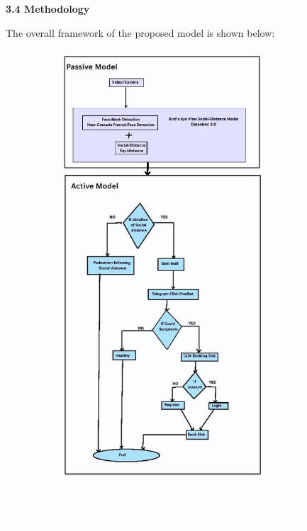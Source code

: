 \documentclass[12pt]{article}
\begin{document}
\vspace{\baselineskip}

\vspace{\baselineskip}

\vspace{\baselineskip}
\vspace{\baselineskip}
\vspace{\baselineskip}
\vspace{\baselineskip}
\vspace{\baselineskip}
\vspace{\baselineskip}

\begin{FlushLeft}
{\fontsize{14pt}{16.8pt}\selectfont \textbf{3.4 Methodology}}
\end{FlushLeft}
\begin{FlushLeft}
The overall framework of the proposed model is shown below:
\end{FlushLeft}



\begin{figure}[H]
	\begin{Center}
		\includegraphics[width=4.32in,height=7in]{./media/image4.png}
	\end{Center}
\end{figure}
\end{document}
